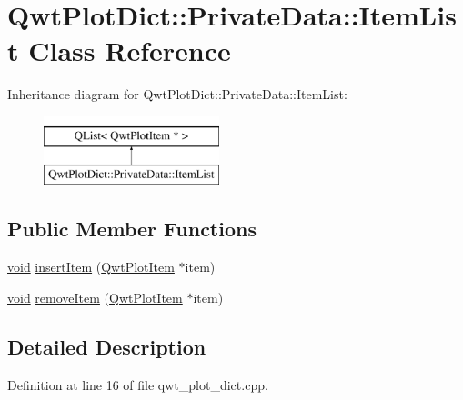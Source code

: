 \hypertarget{class_qwt_plot_dict_1_1_private_data_1_1_item_list}{\section{Qwt\-Plot\-Dict\-:\-:Private\-Data\-:\-:Item\-List Class Reference}
\label{class_qwt_plot_dict_1_1_private_data_1_1_item_list}
}
Inheritance diagram for Qwt\-Plot\-Dict\-:\-:Private\-Data\-:\-:Item\-List\-:\begin{figure}[H]
\begin{center}
\leavevmode
\includegraphics[height=2.000000cm]{class_qwt_plot_dict_1_1_private_data_1_1_item_list}
\end{center}
\end{figure}
\subsection*{Public Member Functions}
\begin{DoxyCompactItemize}
\item 
\hyperlink{group___u_a_v_objects_plugin_ga444cf2ff3f0ecbe028adce838d373f5c}{void} \hyperlink{class_qwt_plot_dict_1_1_private_data_1_1_item_list_aa6921f9051238ff5c5aeb63a49477dfe}{insert\-Item} (\hyperlink{class_qwt_plot_item}{Qwt\-Plot\-Item} $\ast$item)
\item 
\hyperlink{group___u_a_v_objects_plugin_ga444cf2ff3f0ecbe028adce838d373f5c}{void} \hyperlink{class_qwt_plot_dict_1_1_private_data_1_1_item_list_a4688f237aed0b650bf6b778895254e0e}{remove\-Item} (\hyperlink{class_qwt_plot_item}{Qwt\-Plot\-Item} $\ast$item)
\end{DoxyCompactItemize}


\subsection{Detailed Description}


Definition at line 16 of file qwt\-\_\-plot\-\_\-dict.\-cpp.



